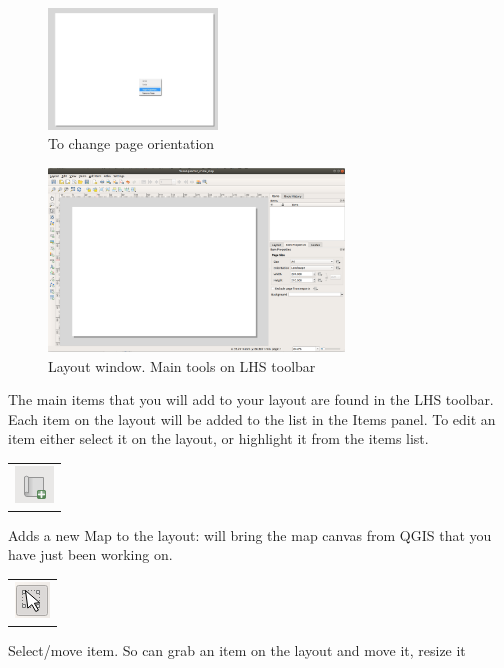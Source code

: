 \begin{figure}[!h]
	\centering
	\includegraphics[width=0.4\textwidth]{images/print_layout_orientation.png}
	\caption{To change page orientation}
	\label{ft_fig_firstfig3}
\end{figure}

\begin{figure}[!h]
	\centering
	\includegraphics[width=0.7\textwidth]{images/print_layout_full_window.png}
	\caption{Layout window. Main tools on LHS toolbar}
	\label{ft_fig_firstfig3}
\end{figure}

The main items that you will add to your layout are found in the LHS toolbar. Each item on the layout will be added to the list in the Items panel. To edit an item either select it on the layout, or highlight it from the items list.\\
\begin{tabular}{@{}c@{}}\includegraphics[width=4ex]{images/adds_a_new_map_to_the_layout_icon.png}\end{tabular} Adds a new Map to the layout: will bring the map canvas from QGIS that you have just been working on.

\begin{tabular}{@{}c@{}}\includegraphics[width=4ex]{images/select_move_item_icon.png}\end{tabular}
  Select/move item.  So can grab an item on the layout and move it, resize it

